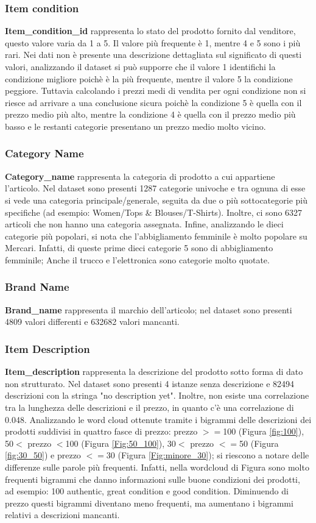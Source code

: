 \subsubsection{Item condition}
\textbf{Item\_condition\_id} rappresenta lo stato del prodotto fornito dal venditore, questo valore varia da 1 a 5.
Il valore più frequente è 1, mentre 4 e 5 sono i più rari. Nei dati non è presente una descrizione dettagliata sul significato di questi valori, analizzando il dataset si può supporre che il valore 1 identifichi la condizione migliore poichè è la più frequente, mentre il valore 5 la condizione peggiore. Tuttavia calcolando i prezzi medi di vendita per ogni condizione non si riesce ad arrivare a una conclusione sicura poichè la condizione 5 è quella con il prezzo medio più alto, mentre la condizione 4 è quella con il prezzo medio più basso e le restanti categorie presentano un prezzo medio molto vicino.
\subsubsection{Category Name}
\textbf{Category\_name} rappresenta la categoria di prodotto a cui appartiene l'articolo.
Nel dataset sono presenti 1287 categorie univoche e tra ognuna di esse si vede una categoria principale/generale, seguita da due o più sottocategorie più specifiche (ad esempio: Women/Tops \& Blouses/T-Shirts). Inoltre, ci sono 6327 articoli che non hanno una categoria assegnata.
Infine, analizzando le dieci categorie più popolari, si nota che l'abbigliamento femminile è molto popolare su Mercari. Infatti, di queste prime dieci categorie 5 sono di abbigliamento femminile; Anche il trucco e l'elettronica sono categorie molto quotate.
\subsubsection{Brand Name}
\textbf{Brand\_name} rappresenta il marchio dell'articolo; nel dataset sono presenti 4809 valori differenti e 632682 valori mancanti.
\subsubsection{Item Description}
\textbf{Item\_description} rappresenta la descrizione del prodotto sotto forma di dato non strutturato. Nel dataset sono presenti 4 istanze senza descrizione e 82494 descrizioni con la stringa "no description yet".
Inoltre, non esiste una correlazione tra la lunghezza delle descrizioni e il prezzo, in quanto c'è una correlazione di 0.048.
Analizzando le word cloud ottenute tramite i bigrammi delle descrizioni  dei prodotti suddivisi in quattro fasce di prezzo: prezzo $>=$100 (Figura \ref{fig:100}), 50$<$ prezzo $<$100 (Figura \ref{Fig:50_100}), 30$<$ prezzo $<=$50 (Figura \ref{fig:30_50}) e prezzo $<=30$ (Figura \ref{Fig:minore_30}); si riescono a notare delle differenze sulle parole più frequenti. Infatti, nella wordcloud di Figura sono molto frequenti bigrammi che danno informazioni sulle buone condizioni dei prodotti, ad esempio:  100 authentic, great condition e good condition.
Diminuendo di prezzo questi bigrammi diventano meno frequenti, ma aumentano i bigrammi relativi a descrizioni mancanti.

